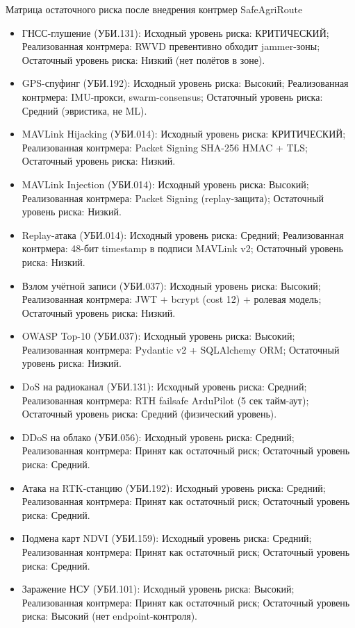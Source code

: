 \documentclass[14pt,a4paper]{extarticle}
\begin{document}
Матрица остаточного риска после внедрения контрмер SafeAgriRoute
\begin{itemize}
\item ГНСС-глушение (УБИ.131): Исходный уровень риска: КРИТИЧЕСКИЙ; Реализованная контрмера: RWVD превентивно обходит jammer-зоны; Остаточный уровень риска: Низкий (нет полётов в зоне).
\item GPS-спуфинг (УБИ.192): Исходный уровень риска: Высокий; Реализованная контрмера: IMU-прокси, swarm-consensus; Остаточный уровень риска: Средний (эвристика, не ML).
\item MAVLink Hijacking (УБИ.014): Исходный уровень риска: КРИТИЧЕСКИЙ; Реализованная контрмера: Packet Signing SHA-256 HMAC + TLS; Остаточный уровень риска: Низкий.
\item MAVLink Injection (УБИ.014): Исходный уровень риска: Высокий; Реализованная контрмера: Packet Signing (replay-защита); Остаточный уровень риска: Низкий.
\item Replay-атака (УБИ.014): Исходный уровень риска: Средний; Реализованная контрмера: 48-бит timestamp в подписи MAVLink v2; Остаточный уровень риска: Низкий.
\item Взлом учётной записи (УБИ.037): Исходный уровень риска: Высокий; Реализованная контрмера: JWT + bcrypt (cost 12) + ролевая модель; Остаточный уровень риска: Низкий.
\item OWASP Top-10 (УБИ.037): Исходный уровень риска: Высокий; Реализованная контрмера: Pydantic v2 + SQLAlchemy ORM; Остаточный уровень риска: Низкий.
\item DoS на радиоканал (УБИ.131): Исходный уровень риска: Средний; Реализованная контрмера: RTH failsafe ArduPilot (5 сек тайм-аут); Остаточный уровень риска: Средний (физический уровень).
\item DDoS на облако (УБИ.056): Исходный уровень риска: Средний; Реализованная контрмера: Принят как остаточный риск; Остаточный уровень риска: Средний.
\item Атака на RTK-станцию (УБИ.192): Исходный уровень риска: Средний; Реализованная контрмера: Принят как остаточный риск; Остаточный уровень риска: Средний.
\item Подмена карт NDVI (УБИ.159): Исходный уровень риска: Средний; Реализованная контрмера: Принят как остаточный риск; Остаточный уровень риска: Средний.
\item Заражение НСУ (УБИ.101): Исходный уровень риска: Высокий; Реализованная контрмера: Принят как остаточный риск; Остаточный уровень риска: Высокий (нет endpoint-контроля).
\end{itemize}
\end{document}
